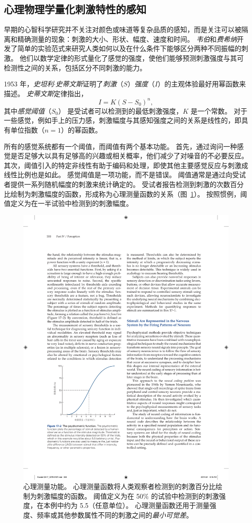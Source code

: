 \subsection{心理物理学量化刺激特性的感知}

早期的心智科学研究并不关注对颜色或味道等复杂品质的感知，而是关注可以被隔离和精确测量的现象：刺激的大小、形状、幅度、速度和时间。 
\textit{韦伯}和\textit{费希纳}开发了简单的实验范式来研究人类如何以及在什么条件下能够区分两种不同振幅的刺激。 
他们以数学定律的形式量化了感觉的强度，使他们能够预测刺激强度与其可检测性之间的关系，包括区分不同刺激的能力。


1953 年，\textit{史坦利$\cdot$史蒂文斯}证明了\textit{刺激}（$ S $）\textit{强度}（$ I $）的主观体验最好用幂函数来描述。 
\textit{史蒂文斯}定律指出，
\begin{equation}
	I = K(S-S_0)^n,
\end{equation}
其中\textit{感觉阈值}（$ S_0 $） 是受试者可以检测到的最低刺激强度，$K$ 是一个常数。 
对于一些感觉，例如手上的压力感，刺激幅度与其感知强度之间的关系是线性的，即具有单位指数（$ n = 1 $）的幂函数。


所有的感觉系统都有一个阈值，而阈值有两个基本功能。 
首先，通过询问一种感觉是否足够大以具有足够高的兴趣或相关概率，他们减少了对噪音的不必要反应。
其次，阈值引入的特定非线性有助于编码和处理，即使其他主要感觉反应与刺激成线性比例也是如此。
感觉阈值是一项功能，而不是错误。 
阈值通常是通过向受试者提供一系列随机幅度的刺激来统计确定的。
受试者报告检测到刺激的次数百分比绘制为刺激幅度的函数，形成称为心理测量函数的关系（图~\ref{fig:17_2}）。 
按照惯例，阈值定义为在一半试验中检测到的刺激幅度。


\begin{figure}[htbp]
	\centering
	\includegraphics[width=0.55\linewidth]{chap17/fig_17_2}
	\caption{心理测量功能。 
		心理测量函数将人类观察者检测到的刺激百分比绘制为刺激幅度的函数。 
		阈值定义为在 50\% 的试验中检测到的刺激强度，在本例中约为 5.5（任意单位）。 
		心理测量函数还用于测量强度、频率或其他参数属性不同的刺激之间的\textit{最小可觉差}。}
	\label{fig:17_2}
\end{figure}


